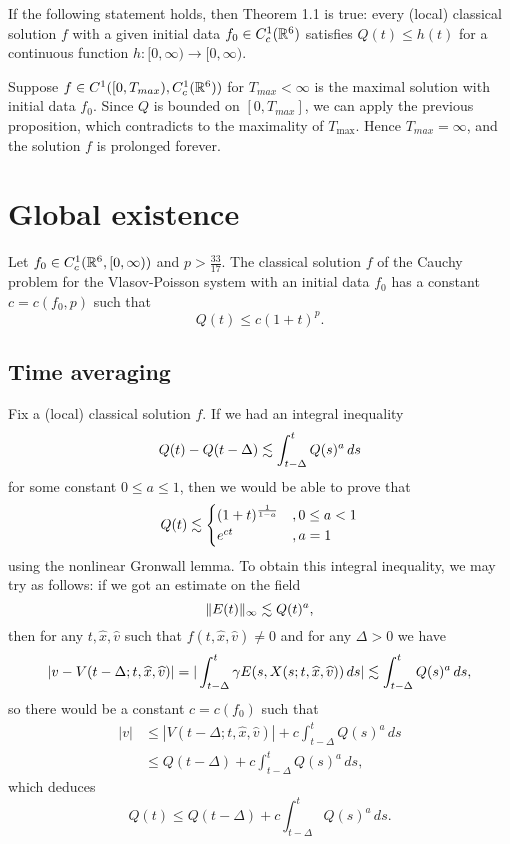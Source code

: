 \documentclass[11pt]{amsart}
\begin{document}
\begin{cor}
If the following statement holds, then Theorem 1.1 is true: every (local) classical solution $f$ with a given initial data $f_0\in C_c^1(\mathbb{R}^6)$ satisfies $Q(t)\le h(t)$ for a continuous function $h:[0,\infty)\to[0,\infty)$.
\end{cor}
\begin{pf}
Suppose $f\in C^1([0,T_{max}),C_c^1(\mathbb{R}^6))$ for $T_{max}<\infty$ is the maximal solution with initial data $f_0$.
Since $Q$ is bounded on $[0,T_{max}]$, we can apply the previous proposition, which contradicts to the maximality of $T_{\max}$.
Hence $T_{max}=\infty$, and the solution $f$ is prolonged forever.
\end{pf}












\section{Global existence}



\begin{thm*}[Schaeffer, 1991]
Let $f_0\in C_c^1(\mathbb{R}^6,[0,\infty))$ and $p>\frac{33}{17}$.
The classical solution $f$ of the Cauchy problem for the Vlasov-Poisson system with an initial data $f_0$ has a constant $c=c(f_0,p)$ such that
\[Q(t)\le c(1+t)^p.\]
\end{thm*}

\subsection{Time averaging}
Fix a (local) classical solution $f$.
If we had an integral inequality
\[Q(t)-Q(t-\Delta)\lesssim\int_{t-\Delta}^tQ(s)^a\,ds\]
for some constant $0\le a\le1$, then we would be able to prove that
\begin{align}\label{gjg}
Q(t)\lesssim\begin{cases}(1+t)^{\frac1{1-a}}&,0\le a<1\\e^{ct}&,a=1\end{cases}
\end{align}
using the nonlinear Gronwall lemma.
To obtain this integral inequality, we may try as follows: if we got an estimate on the field
\[\|E(t)\|_\infty\lesssim Q(t)^a,\]
then for any $t,\hat x,\hat v$ such that $f(t,\hat x,\hat v)\ne0$ and for any $\Delta>0$ we have
\[|v-V(t-\Delta;t,\widehat x,\widehat v)|=|\int_{t-\Delta}^t\gamma E(s,X(s;t,\widehat x,\widehat v))\,ds|\lesssim\int_{t-\Delta}^tQ(s)^a\,ds,\]
so there would be a constant $c=c(f_0)$ such that
\begin{align*}
|v|&\le|V(t-\Delta;t,\hat x,\hat v)|+c\int_{t-\Delta}^tQ(s)^a\,ds\\
&\le Q(t-\Delta)+c\int_{t-\Delta}^tQ(s)^a\,ds,
\end{align*}
which deduces
\[Q(t)\le Q(t-\Delta)+c\int_{t-\Delta}^tQ(s)^a\,ds.\]
\end{document}
